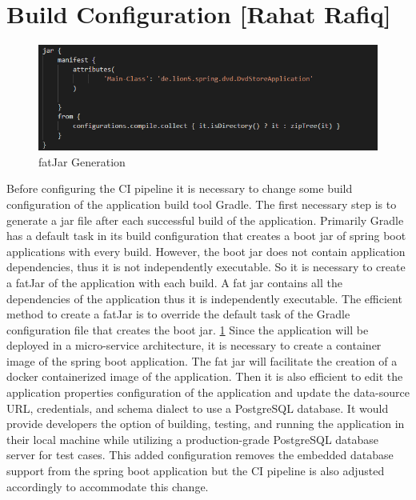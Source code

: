 \section{Build Configuration [Rahat Rafiq]}\label{sec:build_config}

\begin{figure}
    \centering
    \includegraphics[width=14cm]{images/Rahat/fatJar.PNG}
    \caption{fatJar Generation}
    \label{fig:Generating_fatJar}
\end{figure}

Before configuring the CI pipeline it is necessary to change some build configuration of the application build tool Gradle. The first necessary step is to generate a jar file after each successful build of the application. Primarily Gradle has a default task in its build configuration that creates a boot jar of spring boot applications with every build. However, the boot jar does not contain application dependencies, thus it is not independently executable. So it is necessary to create a fatJar of the application with each build. A fat jar contains all the dependencies of the application thus it is independently executable. The efficient method to create a fatJar is to override the default task of the Gradle configuration file that creates the boot jar. \ref{fig:Generating_fatJar} Since the application will be deployed in a micro-service architecture, it is necessary to create a container image of the spring boot application. The fat jar will facilitate the creation of a docker containerized image of the application. Then it is also efficient to edit the application properties configuration of the application and update the data-source URL, credentials, and schema dialect to use a PostgreSQL database. It would provide developers the option of building, testing, and running the application in their local machine while utilizing a production-grade PostgreSQL database server for test cases. This added configuration removes the embedded database support from the spring boot application but the CI pipeline is also adjusted accordingly to accommodate this change.